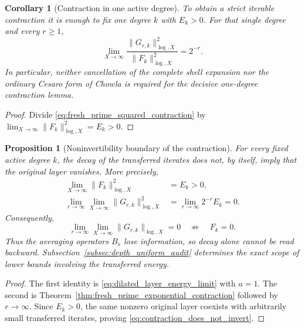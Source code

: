 \documentclass[11pt]{amsart}
\numberwithin{equation}{section}
\theoremstyle{plain}
\newtheorem{proposition}[theorem]{Proposition}
\newtheorem{corollary}[theorem]{Corollary}
\theoremstyle{definition}
\theoremstyle{remark}
\begin{document}
\begin{corollary}[Contraction in one active degree]
\label{cor:one_active_degree_contraction}
To obtain a strict iterable contraction it is enough to fix one degree $k$ with $E_k>0$.  For that single degree and every $r\geq1$,
\begin{equation}
\lim_{X\to\infty}
\frac{\|G_{r,k}\|_{\log,X}^2}{\|F_k\|_{\log,X}^2}
=
2^{-r}.
\label{eq:one_active_degree_relative_contraction}
\end{equation}
In particular, neither cancellation of the complete shell expansion nor the ordinary Cesaro form of Chowla is required for the decisive one-degree contraction lemma.
\end{corollary}

\begin{proof}
Divide \eqref{eq:fresh_prime_squared_contraction} by
$\lim_{X\to\infty}\|F_k\|_{\log,X}^2=E_k>0$.
\end{proof}

\begin{proposition}[Noninvertibility boundary of the contraction]
\label{prop:contraction_noninvertibility_boundary}
For every fixed active degree $k$, the decay of the transferred iterates does not, by itself, imply that the original layer vanishes.  More precisely,
\begin{align}
\lim_{X\to\infty}\|F_k\|_{\log,X}^2
&=E_k>0,
\label{eq:original_active_layer_positive_energy}
\\
\lim_{r\to\infty}\lim_{X\to\infty}
\|G_{r,k}\|_{\log,X}^2
&=
\lim_{r\to\infty}2^{-r}E_k=0.
\label{eq:transferred_iterates_vanish_with_positive_source}
\end{align}
Consequently,
\begin{equation}
\boxed{
\lim_{r\to\infty}\lim_{X\to\infty}
\|G_{r,k}\|_{\log,X}=0
\quad\not\Longrightarrow\quad
F_k=0.}
\label{eq:contraction_does_not_invert}
\end{equation}
Thus the averaging operators $B_s$ lose information, so decay alone cannot be read backward.  Subsection~\ref{subsec:depth_uniform_audit} determines the exact scope of lower bounds involving the transferred energy.
\end{proposition}

\begin{proof}
The first identity is \eqref{eq:dilated_layer_energy_limit} with $a=1$.  The second is Theorem~\ref{thm:fresh_prime_exponential_contraction} followed by $r\to\infty$.  Since $E_k>0$, the same nonzero original layer coexists with arbitrarily small transferred iterates, proving \eqref{eq:contraction_does_not_invert}.
\end{proof}
\end{document}
